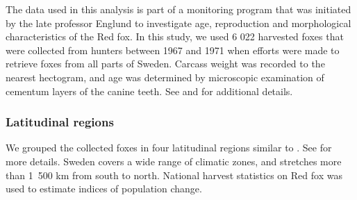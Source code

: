 \documentclass[12pt,a4paper,final,abstract=true,headings=small]{scrartcl}
\begin{document}
The data used in this analysis is part of a monitoring program that was initiated by the late professor Englund to investigate age, reproduction and morphological characteristics of the Red fox. In this study, we used 6 022 harvested foxes that were collected from hunters between 1967 and 1971 when efforts were made to retrieve foxes from all parts of Sweden. Carcass weight was recorded to the nearest hectogram, and age was determined by microscopic examination of cementum layers of the canine teeth.  See \citet{englundStudiesFoodEcology1965} and \citet{englundAspectsReproductionMortality1970} for additional details.

\subsubsection*{Latitudinal regions}

We grouped the collected foxes in four latitudinal regions similar to \cite{englundAspectsReproductionMortality1970}.  See \citep{zhengEstimatingNetPrimary2004, GeographySweden2025,MarkanvandningenSverigeLand2013} for more details. Sweden covers a wide range of climatic zones, and stretches more than 1~500 km from south to north. National harvest statistics \citep{Viltdata} on Red fox was used to estimate indices of population change.
\end{document}
